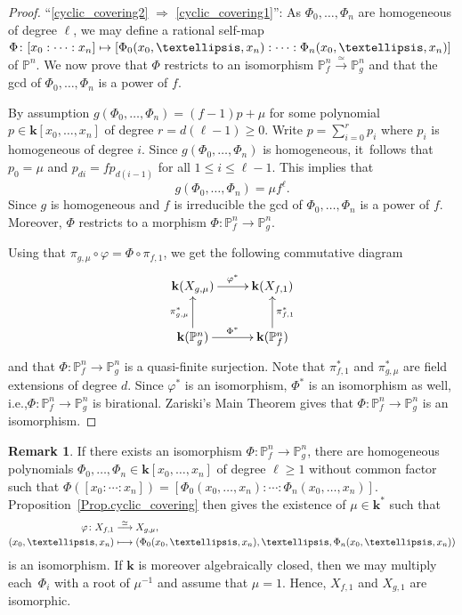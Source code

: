 \documentclass[11pt]{article}
\newcommand{\ie}{i.e.,\xspace}
\newcommand\mto{\mathchoice{\longmapsto}{\mapsto}{\mapsto}{\mapsto}}
\theoremstyle{definition}
\newtheorem{remark}[lemma]{Remark}
\newcommand\iso{\stackrel{\simeq}{\longrightarrow}}
\renewcommand\k{{\mathbf k}}
\newcommand\p{{\mathbb P}}\let\PP\p
\newcommand{\kk}{\mathbf{k}}
\begin{document}
\begin{proof}
``\eqref{cyclic_covering2} $\Rightarrow$ \eqref{cyclic_covering1}'': As $\Phi_0, \ldots, \Phi_{n}$ are homogeneous of degree $\ell$, we may define a rational self-map $\Phi\colon [x_0:\cdots:x_n]\mto [\Phi_0(x_0,\ldots,x_n):\cdots: \Phi_n(x_0,\ldots,x_n)]$ of $\p^n$. We now prove that $\Phi$ restricts to an isomorphism $\p^n_f\iso \p^n_g$ and that the gcd
of $\Phi_0, \ldots, \Phi_n$ is a power of $f$.

By assumption $g(\Phi_0, \ldots, \Phi_n) = (f-1) p + \mu$ for some polynomial $p \in \kk[x_0, \ldots, x_n]$
of degree $r = d (\ell-1) \geq 0$.
Write $p = \sum_{i=0}^r p_i$ where $p_i$ is homogeneous of degree $i$.
Since $g(\Phi_0, \ldots, \Phi_n)$ is homogeneous, it~follows that $p_0 = \mu$ and $p_{di} = f p_{d(i-1)}$ for all
$1 \leq i \leq \ell-1$. This implies that
\[
g(\Phi_0, \ldots, \Phi_n) = \mu f^{\ell}.
\]
Since $g$ is homogeneous
and $f$ is irreducible the gcd of $\Phi_0, \ldots, \Phi_n$ is a power of $f$.
Moreover, $\Phi$ restricts to a morphism $\Phi \colon \p^n_f\to \p^n_g$.

Using that $\pi_{g, \mu} \circ \varphi = \Phi \circ \pi_{f, 1}$, we get the following commutative diagram
\[
\xymatrix{
\kk(X_{g, \mu}) \ar[r]^-{\varphi^\ast} & \kk(X_{f, 1}) \\
\kk(\PP^n_g) \ar[u]^-{\pi_{g, \mu}^\ast} \ar[r]^-{\Phi^\ast} & \kk(\PP^n_f) \ar[u]_-{\pi_{f, 1}^\ast}
}
\]
and that $\Phi \colon \p^n_f\to \p^n_g$ is a quasi-finite surjection.
Note that $\pi_{f, 1}^\ast$ and $\pi_{g, \mu}^\ast$ are field extensions of degree $d$.
Since $\varphi^\ast$ is an isomorphism, $\Phi^\ast$ is an isomorphism as well, \ie $\Phi \colon \PP^n_f \to \PP^n_g$
is birational. Zariski's Main Theorem \cite[Cor.\,4.4.9]{Gr1961Elements-de-geomet-III}
gives that $\Phi \colon \PP^n_f \to \PP^n_g$ is an isomorphism.
\end{proof}

\begin{remark}\label{Rem.mu_equal_1}
If there exists an isomorphism $\Phi \colon \PP^n_f \to \PP^n_g$, there are homogeneous polynomials
$\Phi_0,\ldots,\Phi_n\in \k[x_0,\ldots,x_n]$ of degree $\ell \geq 1$ without common factor
such that
$\Phi([x_0: \cdots: x_n]) = [\Phi_0(x_0,\ldots,x_n):\cdots: \Phi_n(x_0,\ldots,x_n)]$.
Proposition~\ref{Prop.cyclic_covering} then gives the existence of $\mu\in \k^*$ such that
\begin{align*}
\varphi\colon X_{f,1} & \iso X_{g,\mu}, \\
(x_0,\ldots,x_n) & \mto (\Phi_0(x_0,\ldots,x_n),\ldots, \Phi_n(x_0,\ldots,x_n))
\end{align*}
is an isomorphism. If $\kk$ is moreover algebraically closed, then
we may multiply each~$\Phi_i$ with a root of $\mu^{-1}$ and assume that $\mu=1$. Hence, $X_{f,1}$ and $X_{g,1}$ are isomorphic.
\end{remark}
\end{document}
